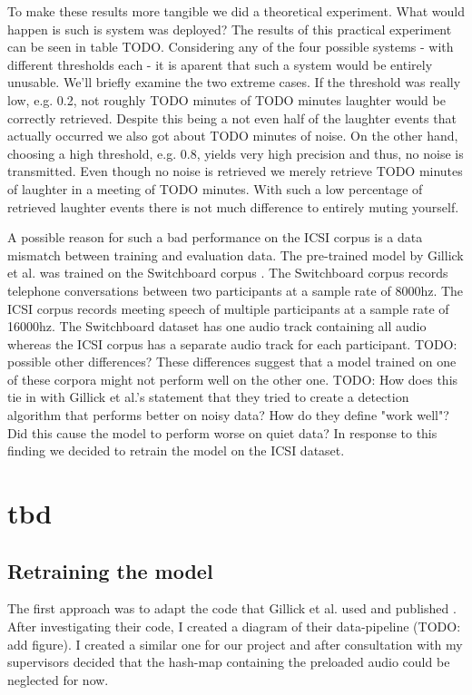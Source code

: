 \documentclass[bsc,frontabs,parskip,deptreport]{infthesis}
\begin{document}
To make these results more tangible we did a theoretical experiment. What would happen is such is system was deployed? The results of this practical experiment can be seen in table TODO. 
Considering any of the four possible systems - with different thresholds each - it is aparent that such a system would be entirely unusable. We'll briefly examine the two extreme cases. If the threshold was really low, e.g. 0.2, not roughly TODO minutes of TODO minutes laughter would be correctly retrieved. Despite this being a not even half of the laughter events that actually occurred we also got about TODO minutes of noise.  
On the other hand, choosing a high threshold, e.g. 0.8, yields very high precision and thus, no noise is transmitted. Even though no noise is retrieved we merely retrieve TODO minutes of laughter in a meeting of TODO minutes. With such a low percentage of retrieved laughter events there is not much difference to entirely muting yourself. 

A possible reason for such a bad performance on the ICSI corpus is a data mismatch between training and evaluation data. The pre-trained model by Gillick et al. \cite{gillick2021robust} was trained on the Switchboard corpus \cite{switchboard-corpus}. The Switchboard corpus records telephone conversations between two participants at a sample rate of 8000hz. The ICSI corpus records meeting speech of multiple participants at a sample rate of 16000hz. The Switchboard dataset has one audio track containing all audio whereas the ICSI corpus has a separate audio track for each participant.  
TODO: possible other differences?
These differences suggest that a model trained on one of these corpora might not perform well on the other one. 
TODO: How does this tie in with Gillick et al.'s statement that they tried to create a detection algorithm that performs better on noisy data? How do they define "work well"? Did this cause the model to perform worse on quiet data?
In response to this finding we decided to retrain the model on the ICSI dataset. 

\chapter{tbd}
\section{Retraining the model}
The first approach was to adapt the code that Gillick et al. used and published \cite{gillick-codebase}. After investigating their code, I created a diagram of their data-pipeline (TODO: add figure). 
I created a similar one for our project and after consultation with my supervisors decided that the hash-map containing the preloaded audio could be neglected for now. 
\end{document}
